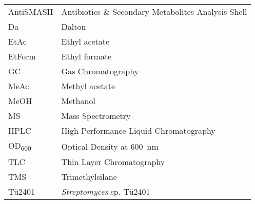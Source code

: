
\begin{table}[htbp]
	\centering
	\begin{tabularx}{\textwidth}{>{\hsize=0.25\hsize}X>{\hsize=0.75\hsize}X}
		AntiSMASH	& Antibiotics \& Secondary Metabolites Analysis Shell	\\
		Da			& Dalton				\\
		EtAc		& Ethyl acetate			\\
		EtForm		& Ethyl formate			\\
		GC			& Gas Chromatography	\\
		MeAc		& Methyl acetate		\\
		MeOH		& Methanol				\\
		MS			& Mass Spectrometry		\\
		HPLC		& High Performance Liquid Chromatography		\\
		OD\textsubscript{600}	& Optical Density at \SI{600}{\nano\meter}	\\
		TLC			& Thin Layer Chromatography 	\\
		TMS 		& Trimethylsilane		\\
		Tü2401		& \textit{Streptomyces} sp. Tü2401		\\
		
		
	\end{tabularx}
\end{table}
